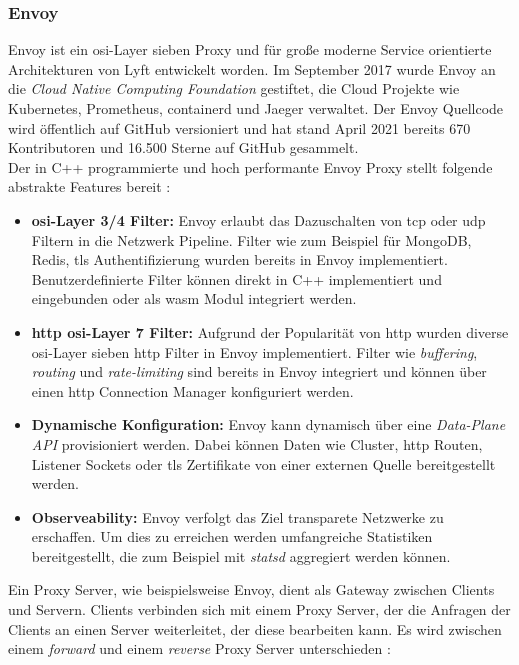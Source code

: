 \subsubsection{Envoy} \label{s:envoy}
Envoy ist ein \ac{osi}-Layer sieben Proxy und für gro{\ss}e moderne Service orientierte Architekturen von Lyft entwickelt worden.
Im September 2017 wurde Envoy an die \textit{Cloud Native Computing Foundation} gestiftet, die Cloud Projekte wie Kubernetes, Prometheus, containerd und Jaeger verwaltet.
Der Envoy Quellcode wird öffentlich auf GitHub versioniert und hat stand April 2021 bereits 670 Kontributoren und 16.500 Sterne auf GitHub gesammelt. \cite{EnvoyproxyEnvoy2021}
\\
Der in C++ programmierte und hoch performante Envoy Proxy stellt folgende abstrakte Features bereit \cite{WhatEnvoyEnvoy}:
\begin{itemize}
    \item \textbf{\acs{osi}-Layer 3/4 Filter:} Envoy erlaubt das Dazuschalten von \acs{tcp} oder \acs{udp} Filtern in die Netzwerk Pipeline. Filter wie zum Beispiel für MongoDB, Redis, \ac{tls} Authentifizierung wurden bereits in Envoy implementiert. Benutzerdefinierte Filter können direkt in C++ implementiert und eingebunden oder als \ac{wasm} Modul integriert werden.
    \item \textbf{\acs{http} \ac{osi}-Layer 7 Filter:} Aufgrund der Popularität von \ac{http} wurden diverse \ac{osi}-Layer sieben \ac{http} Filter in Envoy implementiert. Filter wie \textit{buffering}, \textit{routing} und \textit{rate-limiting} sind bereits in Envoy integriert und können über einen \ac{http} Connection Manager konfiguriert werden.
    \item \textbf{Dynamische Konfiguration:} Envoy kann dynamisch über eine \textit{Data-Plane API} provisioniert werden. Dabei können Daten wie Cluster, \ac{http} Routen, Listener Sockets oder \ac{tls} Zertifikate von einer externen Quelle bereitgestellt werden.
    \item \textbf{Observeability:} Envoy verfolgt das Ziel transparete Netzwerke zu erschaffen. Um dies zu erreichen werden umfangreiche Statistiken bereitgestellt, die zum Beispiel mit \textit{statsd} aggregiert werden können.
\end{itemize}
Ein Proxy Server, wie beispielsweise Envoy, dient als Gateway zwischen Clients und Servern.
Clients verbinden sich mit einem Proxy Server, der die Anfragen der Clients an einen Server weiterleitet, der diese bearbeiten kann. Es wird zwischen einem \textit{forward} und einem \textit{reverse} Proxy Server unterschieden \cite{WhatReverseProxy}:
